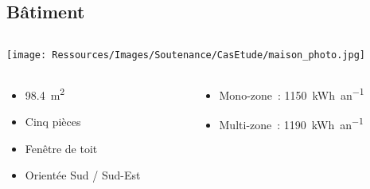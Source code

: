 \documentclass[xcolor=x11names, compress, 11pt]{beamer}
\begin{document}
\subsection{Bâtiment}
\begin{frame}[noframenumbering, c]
    \vfill
    \centering
    \begin{columns}
        \begin{column}{0.4\textwidth}
            \texttt{[image: Ressources/Images/Soutenance/CasEtude/maison\_photo.jpg]}
        \end{column}
        \begin{column}{0.6\textwidth}
        \end{column}
    \end{columns}
    \vfill
    \begin{columns}
        \begin{column}{0.6\textwidth}
            \centering
            \begin{itemize}
                \item \SI{98.4}{\metre\squared}
                \item Cinq pièces
                \item Fenêtre de toit
                \item Orientée Sud / Sud-Est
            \end{itemize}
        \end{column}%
        \begin{column}{0.7\textwidth}
            \centering
            \begin{itemize}
                \item<3-> Mono-zone~: \SI{1150}{kWh\per an}
                \item<3-> Multi-zone~: \SI{1190}{kWh\per an}
            \end{itemize}
        \end{column}%
    \end{columns}%
    \vfill
\end{frame}



\end{document}
